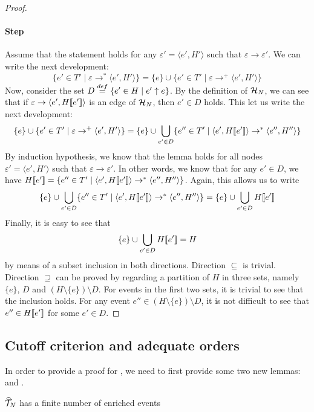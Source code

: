 \begin{proof}
\paragraph{Step} Assume that the statement holds for any $\varepsilon' =
\langle e', H' \rangle$ such that $\varepsilon \to \varepsilon'$.  We can write
the next development: $$\{e' \in T' \mid \varepsilon \to^* \langle e', H'
\rangle \} = \{e\} \cup \{e' \in T' \mid \varepsilon \to^+ \langle e', H'
\rangle \}$$  Now, consider the set $D \stackrel{def}{=} \{e' \in H \mid e' \uparrow
e\}$.  By the definition of $\mathcal{H}_{N}$, we can see that if $\varepsilon \to
\langle e', H [\![ e']\!] \rangle$ is an edge of $\mathcal{H}_{N}$, then $e' \in D$ holds.
This let us write the next development: $$\{e\} \cup \{e' \in T' \mid
\varepsilon \to^+ \langle e', H' \rangle \} = \{e\} \cup \bigcup_{e' \in D}
\{e'' \in T' \mid \langle e', H [\![ e']\!] \rangle \to^* \langle e'', H''
\rangle\}$$  By induction hypothesis, we know that the lemma holds for all
nodes $\varepsilon' = \langle e', H' \rangle$ such that $\varepsilon \to
\varepsilon'$.  In other words, we know that for any $e' \in D$, we have $H
[\![ e']\!] = \{e'' \in T' \mid \langle e', H [\![ e']\!] \rangle \to^* \langle e'',
H'' \rangle\}$.  Again, this allows us to write $$\{e\} \cup \bigcup_{e' \in D}
\{e'' \in T' \mid \langle e', H [\![ e']\!] \rangle \to^* \langle e'', H''
\rangle\} = \{e\} \cup \bigcup_{e' \in D} H [\![ e']\!]$$ Finally, it is easy to
see that $$\{e\} \cup \bigcup_{e' \in D} H [\![ e']\!] = H$$ by means of a subset
inclusion in both directions.  Direction $\subseteq$ is trivial.  Direction
$\supseteq$ can be proved by regarding a partition of $H$ in three sets,
namely $\{e\}$, $D$ and $(H \setminus \{e\}) \setminus D$.  For events in the
first two sets, it is trivial to see that the inclusion holds.  For any event
$e'' \in (H \setminus \{e\}) \setminus D$, it is not difficult to see that $e''
\in H [\![ e']\!]$ for some $e' \in D$.
\end{proof}


\subsection{Cutoff criterion and adequate orders}

In order to provide a proof for , we need to first provide
some two new lemmas:  and .

\setcounter{theorem}{18}
\begin{lemma}
\label{lem:atrunc.has}
$\widehat{\mathcal{T}}_{N}$ has a finite number of enriched events
\end{lemma}

